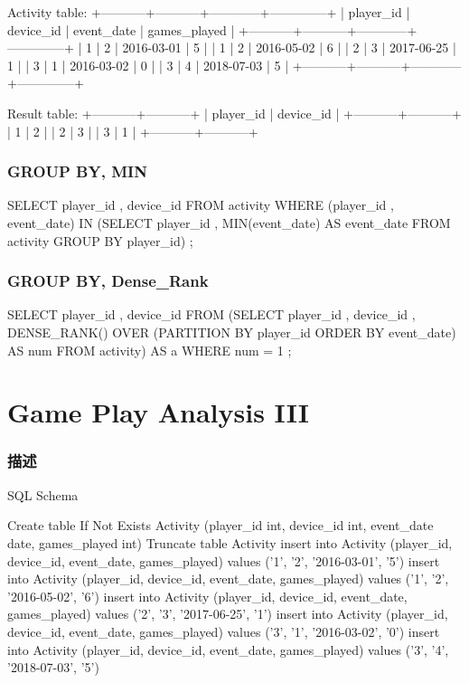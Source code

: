 \begin{Code}
Activity table:
+-----------+-----------+------------+--------------+
| player_id | device_id | event_date | games_played |
+-----------+-----------+------------+--------------+
| 1         | 2         | 2016-03-01 | 5            |
| 1         | 2         | 2016-05-02 | 6            |
| 2         | 3         | 2017-06-25 | 1            |
| 3         | 1         | 2016-03-02 | 0            |
| 3         | 4         | 2018-07-03 | 5            |
+-----------+-----------+------------+--------------+

Result table:
+-----------+-----------+
| player_id | device_id |
+-----------+-----------+
| 1         | 2         |
| 2         | 3         |
| 3         | 1         |
+-----------+-----------+
\end{Code}


\subsubsection{GROUP BY, MIN}
\begin{Code}
SELECT
    player_id
    , device_id
FROM
    activity
WHERE
    (player_id
     , event_date) 
IN
    (SELECT
         player_id
         , MIN(event_date) AS event_date
     FROM
         activity
     GROUP BY player_id)
;
\end{Code}

\subsubsection{GROUP BY, Dense_Rank}
\begin{Code}
SELECT
    player_id
    , device_id
FROM
    (SELECT
         player_id
         , device_id
         , DENSE_RANK() OVER (PARTITION BY player_id ORDER BY event_date) AS num
    FROM
         activity) AS a
    WHERE
        num = 1
;
\end{Code}


\section{Game Play Analysis III} %
\label{sec:game-play-analysis-iii}


\subsubsection{描述}
SQL Schema

\begin{Code}
Create table If Not Exists Activity (player_id int, device_id int, event_date date, games_played int)
Truncate table Activity
insert into Activity (player_id, device_id, event_date, games_played) values ('1', '2', '2016-03-01', '5')
insert into Activity (player_id, device_id, event_date, games_played) values ('1', '2', '2016-05-02', '6')
insert into Activity (player_id, device_id, event_date, games_played) values ('2', '3', '2017-06-25', '1')
insert into Activity (player_id, device_id, event_date, games_played) values ('3', '1', '2016-03-02', '0')
insert into Activity (player_id, device_id, event_date, games_played) values ('3', '4', '2018-07-03', '5')
\end{Code}

